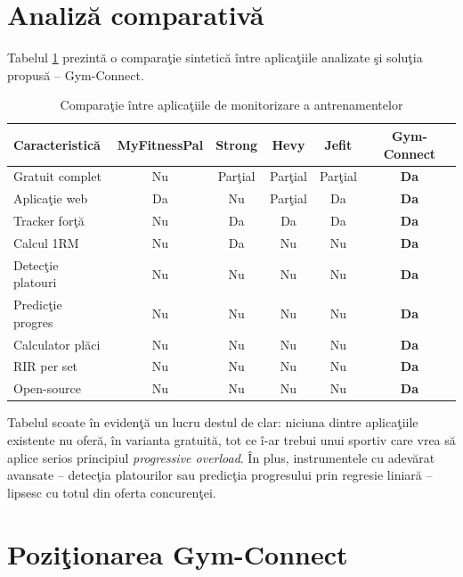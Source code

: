 \section{Analiz\u a comparativ\u a}

Tabelul \ref{tab:comparatie} prezint\u a o compara\c tie sintetic\u a \^ intre
aplica\c tiile analizate \c si solu\c tia propus\u a -- Gym-Connect.

\begin{table}[htbp]
\centering
\caption{Compara\c tie \^ intre aplica\c tiile de monitorizare a antrenamentelor}
\label{tab:comparatie}
\begin{tabular}{|l|c|c|c|c|c|}
\hline
\textbf{Caracteristic\u a} & \textbf{MyFitnessPal} & \textbf{Strong} &
\textbf{Hevy} & \textbf{Jefit} & \textbf{Gym-Connect} \\
\hline
Gratuit complet       & Nu  & Par\c tial & Par\c tial & Par\c tial & \textbf{Da} \\
\hline
Aplica\c tie web      & Da  & Nu      & Par\c tial & Da      & \textbf{Da} \\
\hline
Tracker for\c t\u a   & Nu  & Da      & Da      & Da      & \textbf{Da} \\
\hline
Calcul 1RM            & Nu  & Da      & Nu      & Nu      & \textbf{Da} \\
\hline
Detec\c tie platouri  & Nu  & Nu      & Nu      & Nu      & \textbf{Da} \\
\hline
Predic\c tie progres  & Nu  & Nu      & Nu      & Nu      & \textbf{Da} \\
\hline
Calculator pl\u aci   & Nu  & Nu      & Nu      & Nu      & \textbf{Da} \\
\hline
RIR per set           & Nu  & Nu      & Nu      & Nu      & \textbf{Da} \\
\hline
Open-source           & Nu  & Nu      & Nu      & Nu      & \textbf{Da} \\
\hline
\end{tabular}
\end{table}

Tabelul scoate \^ in eviden\c t\u a un lucru destul de clar: niciuna dintre
aplica\c tiile existente nu ofer\u a, \^ in varianta gratuit\u a, tot ce \^ i-ar
trebui unui sportiv care vrea s\u a aplice serios principiul
\textit{progressive overload}. \^ In plus, instrumentele cu adev\u arat
avansate -- detec\c tia platourilor sau predic\c tia progresului prin
regresie liniar\u a -- lipsesc cu totul din oferta concuren\c tei.

\section{Pozi\c tionarea Gym-Connect}


